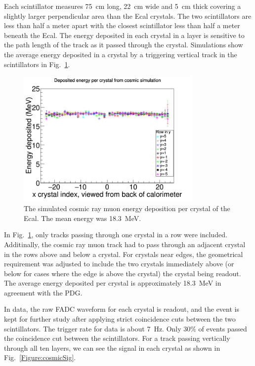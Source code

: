 \documentclass[12pt]{report}
\begin{document}
Each scintillator measures 75~cm long, 22~cm wide and 5~cm thick covering a slightly larger perpendicular area than the Ecal crystals. The two scintillators are less than half a meter apart with the closest scintillator less than half a meter beneath the Ecal. The energy deposited in each crystal in a layer is sensitive to the path length of the track as it passed through the crystal. Simulations show the average energy deposited in a crystal by a triggering vertical track in the scintillators in Fig.~\ref{Figure:cosmicEdep}.

\begin{figure}[H]
  \centering
      \includegraphics[width=0.8\textwidth]{pics/performance/cosmicEdep.png}
  \caption[Simulation of energy deposited per Ecal module from cosmic rays]{The simulated cosmic ray muon energy deposition per crystal of the Ecal. The mean energy was 18.3~MeV.}
  \label{Figure:cosmicEdep}
\end{figure}

In Fig.~\ref{Figure:cosmicEdep}, only tracks passing through one crystal in a row were included. Additinally, the cosmic ray muon track had to pass through an adjacent crystal in the rows above and below a crystal. For crystals near edges, the geometrical requirement was adjusted to include the two crystals immediately above (or below for cases where the edge is above the crystal) the crystal being readout. The average energy deposited per crystal is approximately 18.3~MeV in agreement with the PDG. 

In data, the raw FADC waveform for each crystal is readout, and the event is kept for further study after applying strict coincidence cuts between the two scintillators. The trigger rate for data is about 7~Hz. Only 30$\%$ of events passed the coincidence cut between the scintillators. For a track passing vertically through all ten layers, we can see the signal in each crystal as shown in Fig.~\ref{Figure:cosmicSig}.
\end{document}
